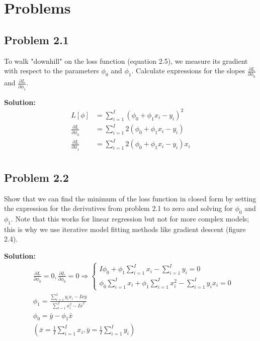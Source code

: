 \documentclass{article}
\begin{document}
\section*{Problems}

    \subsection*{Problem 2.1}
    To walk "downhill" on the loss function (equation 2.5), we measure its gradient with respect to the parameters $\phi_0$ and $\phi_1$. Calculate expressions for the slopes $\frac{\partial L}{\partial \phi_0}$ and $\frac{\partial L}{\partial \phi_1}$.

        \vspace{1cm}
        \textbf{Solution:}
        \begin{align*}
            L[\phi] &= \sum_{i=1}^I (\phi_0 + \phi_1x_i - y_i)^2 \tag{2.5} \\
            \frac{\partial L}{\partial \phi_0} &= \sum_{i=1}^I 2(\phi_0 + \phi_1x_i - y_i) \\
            \frac{\partial L}{\partial \phi_1} &= \sum_{i=1}^I 2(\phi_0 + \phi_1x_i - y_i)x_i \\
        \end{align*}

    \subsection*{Problem 2.2}
    Show that we can find the minimum of the loss function in closed form by setting the expression for the derivatives from problem 2.1 to zero and solving for $\phi_0$ and $\phi_1$. Note that this works for linear regression but not for more complex models; this is why we use iterative model fitting methods like gradient descent (figure 2.4).

        \vspace{1cm}
        \textbf{Solution:}
        \begin{align*}
            & \frac{\partial L}{\partial \phi_0} = 0, \frac{\partial L}{\partial \phi_0} = 0 \Rightarrow \left\{
            \begin{array}{l}
            I\phi_0 + \phi_1\sum_{i=1}^I x_i - \sum_{i=1}^I y_i = 0 \\
            \phi_0\sum_{i=1}^I x_i + \phi_1\sum_{i=1}^I x_i^2 - \sum_{i=1}^I y_ix_i = 0
            \end{array}
            \right. \\
            & \phi_1 = \frac{\sum_{i=1}^I y_ix_i - I\bar{x}\bar{y}}{\sum_{i=1}^I x_i^2 - I\bar{x}^2} \\
            & \phi_0 = \bar{y} - \phi_1\bar{x} \\
            & (\bar{x} = \frac{1}{I}\sum_{i=1}^I x_i, \bar{y} = \frac{1}{I}\sum_{i=1}^I y_i)
        \end{align*}
\end{document}
